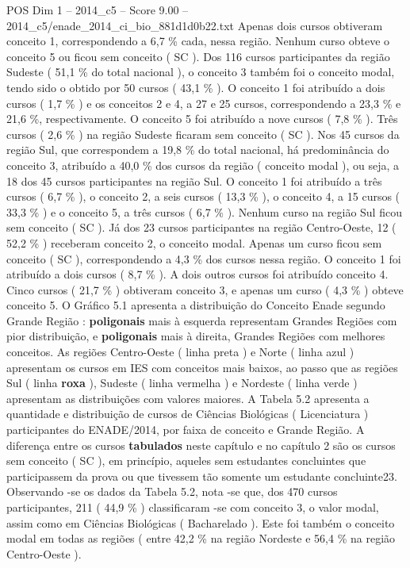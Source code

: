 \begin{textsample}{POS Dim 1 – 2014\_c5 – Score 9.00 – 2014\_c5/enade\_2014\_ci\_bio\_881d1d0b22.txt}
Apenas dois cursos obtiveram conceito 1, correspondendo a 6,7 \% cada, nessa região.
Nenhum curso obteve o conceito 5 ou ficou sem conceito ( SC ).
Dos 116 cursos participantes da região Sudeste ( 51,1 \% do total nacional ), o conceito 3 também foi o conceito modal, tendo sido o obtido por 50 cursos ( 43,1 \% ).
O conceito 1 foi atribuído a dois cursos ( 1,7 \% ) e os conceitos 2 e 4, a 27 e 25 cursos, correspondendo a 23,3 \% e 21,6 \%, respectivamente.
O conceito 5 foi atribuído a nove cursos ( 7,8 \% ).
Três cursos ( 2,6 \% ) na região Sudeste ficaram sem conceito ( SC ).
Nos 45 cursos da região Sul, que correspondem a 19,8 \% do total nacional, há predominância do conceito 3, atribuído a 40,0 \% dos cursos da região ( conceito modal ), ou seja, a 18 dos 45 cursos participantes na região Sul.
O conceito 1 foi atribuído a três cursos ( 6,7 \% ), o conceito 2, a seis cursos ( 13,3 \% ), o conceito 4, a 15 cursos ( 33,3 \% ) e o conceito 5, a três cursos ( 6,7 \% ).
Nenhum curso na região Sul ficou sem conceito ( SC ).
Já dos 23 cursos participantes na região Centro-Oeste, 12 ( 52,2 \% ) receberam conceito 2, o conceito modal.
Apenas um curso ficou sem conceito ( SC ), correspondendo a 4,3 \% dos cursos nessa região.
O conceito 1 foi atribuído a dois cursos ( 8,7 \% ).
A dois outros cursos foi atribuído conceito 4.
Cinco cursos ( 21,7 \% ) obtiveram conceito 3, e apenas um curso ( 4,3 \% ) obteve conceito 5.
O Gráfico 5.1 apresenta a distribuição do Conceito Enade segundo Grande Região : \textbf{poligonais} mais à esquerda representam Grandes Regiões com pior distribuição, e \textbf{poligonais} mais à direita, Grandes Regiões com melhores conceitos.
As regiões Centro-Oeste ( linha preta ) e Norte ( linha azul ) apresentam os cursos em IES com conceitos mais baixos, ao passo que as regiões Sul ( linha \textbf{roxa} ), Sudeste ( linha vermelha ) e Nordeste ( linha verde ) apresentam as distribuições com valores maiores.
A Tabela 5.2 apresenta a quantidade e distribuição de cursos de Ciências Biológicas ( Licenciatura ) participantes do ENADE/2014, por faixa de conceito e Grande Região.
A diferença entre os cursos \textbf{tabulados} neste capítulo e no capítulo 2 são os cursos sem conceito ( SC ), em princípio, aqueles sem estudantes concluintes que participassem da prova ou que tivessem tão somente um estudante concluinte23.
Observando -se os dados da Tabela 5.2, nota -se que, dos 470 cursos participantes, 211 ( 44,9 \% ) classificaram -se com conceito 3, o valor modal, assim como em Ciências Biológicas ( Bacharelado ).
Este foi também o conceito modal em todas as regiões ( entre 42,2 \% na região Nordeste e 56,4 \% na região Centro-Oeste ).

\end{textsample}
